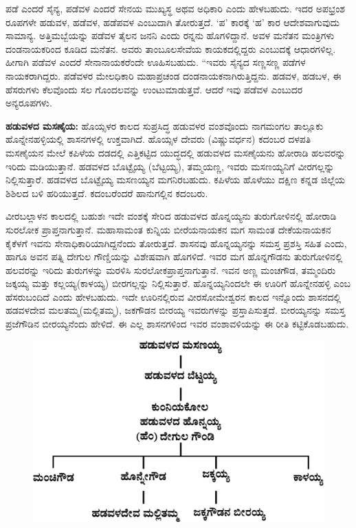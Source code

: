ಪಡೆ ಎಂದರೆ ಸೈನ್ಯ, ಪಡೆವಳ ಎಂದರೆ ಸೇನಯ ಮುಖ್ಯಸ್ಥ ಅಥವ ಅಧಿಕಾರಿ ಎಂದು ಹೇಳಬಹುದು. ಇದರ ಅಪಭ್ರಂಶ ರೂಪಗಳೇ ಹಡುವಳ, ಹಡೆವಳ, ಹಡೆಪವಳ ಎಂಬುದಾಗಿ ತೋರುತ್ತದೆ. ‘ಪ’ ಕಾರಕ್ಕೆ ‘ಹ’ ಕಾರ ಆದೇಶವಾಗುವುದು ಸಾಮಾನ್ಯ. ಅತ್ತಿಮಬ್ಬೆಯನ್ನು ಪಡೆವಳ ತೈಲನ ಜನನಿ ಎಂದು ರನ್ನನು ಹೊಗಳಿದ್ದಾನೆ. ಅವಳ ಮನೆತನ ಮಂತ್ರಿಗಳು ದಂಡನಾಯಕರಿಂದ ಕೂಡಿದ ಮನೆತನ. ಅವರು ತಾಂಬೂಲಸೇವೆಯ ಕಾಯಕದಲ್ಲಿದ್ದರು ಎಂಬುದಕ್ಕೆ ಆಧಾರಗಳಿಲ್ಲ. ಹೀಗಾಗಿ ಪಡೆವಳ ಎಂದರೆ ಸೇನಾನಾಯಕರೆಂದೇ ಊಹಿಸಬಹುದು. “ಇವರು ಸೈನ್ಯದ ಸಣ್ಣಸಣ್ಣ ಪಡೆಗಳ ನಾಯಕರಾಗಿದ್ದರು. ಪಡೆವಳರ ಮೇಲಧಿಕಾರಿ ಮಹಾಪ್ರಚಂಡ ದಂಡನಾಯಕನಾಗಿರುತ್ತಿದ್ದನು. ಹಡವಳ, ಹಡಬಳ, ಈ ಹೆಸರುಗಳು ಕೆಲವೊಂದು ಸಲ ಗೊಂದಲವನ್ನು ಉಂಟುಮಾಡುತ್ತವೆ. ಆದರೆ ಇವು ಪಡೆವಳ ಎಂಬುದರ ಅನ್ಯರೂಪಗಳು.

\newpage

\textbf{ಹಡುವಳದ ಮಸಣೈಯ:} ಹೊಯ್ಸಳರ ಕಾಲದ ಸುಪ್ರಸಿದ್ಧ ಹಡುವಳರ ವಂಶವೊಂದು ನಾಗಮಂಗಲ ತಾಲ್ಲೂಕು ಹೊನ್ನೇನಹಳ್ಳಿಯಲ್ಲಿ ಶಾಸನಗಳಲ್ಲಿ ಉಕ್ತವಾಗಿದೆ. ಹೊಯ್ಸಳ ದೇವರು (ವಿಷ್ಣುವರ್ಧನ) ಕದಂಬರ ದಳಪತಿ ಮಸಣೈಯನ ಮೇಲೆ ಕಪಿಳೆಯ ದಡದಲ್ಲಿ ಎತ್ತಿಕಟ್ಟಿದ ಯುದ್ಧದಲ್ಲಿ ಹಡುವಳದ ಮಸಣೈಯನು ಹೋರಾಡಿ ಹಲವರನ್ನು ಇರಿದು ಮಡಿಯುತ್ತಾನೆ. ಹಡವಳದ ಬೊಟ್ಟೈಯ್ಯ (ಬೆಟ್ಟಯ್ಯ), ತಮ್ಮಯಣ್ಣ, ಇವರು ಮಸಣಯ್ಯನಿಗೆ ವೀರಗಲ್ಲನ್ನು ನಿಲ್ಲಿಸುತ್ತಾರೆ. ಹಡವಳದ ಬೊಟ್ಟೈಯ್ಯ ಮಸಣಯ್ಯನ ಮಗನಿರಬಹುದು. ಕಪಿಳೆಯ ಹೊಳೆಯು ದಕ್ಷಿಣ ಕನ್ನಡ ಜಿಲ್ಲೆಯ ಶಿಶಿಲದ ಬಳಿ ಹರಿಯುತ್ತದೆ. ಕದಂಬರೆಂದರೆ ಹಾನುಗಲ್ಲಿನ ಕದಂಬರು.

ವೀರಬಲ್ಲಾಳನ ಕಾಲದಲ್ಲಿ ಬಹುಶಃ ಇದೇ ವಂಶಕ್ಕೆ ಸೇರಿದ ಹಡುವಳದ ಹೊನ್ನಯ್ಯನು ತುರುಗೋಳಿನಲ್ಲಿ ಹೋರಾಡಿ ಸುರಲೋಕ ಪ್ರಾಪ್ತನಾಗುತ್ತಾನೆ. ಮಹಾಸಾಮಂತ ಕುನ್ನಿಯ ಬೀರೆಯನಾಯಕನ ಮಗ ಸಾಮಂತ ದೇಕೆಯನಾಯಕನ ಕೈಕೆಳಗೆ ಇವನು ಸೇನಾಧಿಕಾರಿಯಾಗಿದ್ದನೆಂದು ತೋರುತ್ತದೆ. ಶಾಸನವು ಹೊನ್ನಯ್ಯನನ್ನು ಸಮಸ್ತ ಪ್ರಶಸ್ತಿ ಸಹಿತ ಎಂದು, ಹಾಗೂ ಅವನ ಪತ್ನಿ ದೇಗುಲ ಗೌಣ್ಡಿಯನ್ನು ವಿಶೇಷವಾಗಿ ಹೊಗಳಿದೆ. ಇವರ ಮಗ ಹೊನ್ನಗೌಡನು ತುರುಗೋಳಿನಲ್ಲಿ ಹಲವರನ್ನು ಇರಿದು ತುರುಗಳನ್ನು ಮರಳಿಸಿ ಸುರಲೋಕಪ್ರಾಪ್ತನಾಗುತ್ತಾನೆ. ಇವನ ಅಣ್ಣ ಮಂಚಗೌಡ, ತಮ್ಮಂದಿರು ಜಕ್ಕಯ್ಯ ಮತ್ತು ಕಲ್ಲಯ್ಯ(ಕಾಳಯ್ಯ) ಬೀರಗಲ್ಲನ್ನು ನಿಲ್ಲಿಸುತ್ತಾರೆ. ಹೊನ್ನಯ್ಯನಿಂದಲೇ ಈ ಊರಿಗೆ ಹೊನ್ನೇನಹಳ್ಳಿ ಎಂಬ ಹೆಸರುಬಂದಿದೆ ಎಂದು ಹೇಳಬಹುದು. ಇದೇ ಊರಿನಲ್ಲಿರುವ ವೀರಸೋಮೇಶ್ವರನ ಕಾಲದ ಇನ್ನೊಂದು ಶಾಸನದಲ್ಲಿ ಹಡವಳದೇವ ಮಲತಮ್ಮ(ಮಲ್ಲಿತಮ್ಮ), ಜಕಗೌಡನ ಬೀರಯ್ಯ ಇವರುಗಳನ್ನು ಪ್ರಸ್ತಾಪಿಸುತ್ತದೆ. ಬೀರಯ್ಯನನ್ನು ಸಮಸ್ತ ಪ್ರಜೆಗೌಡಿನ ಬೀರಯ್ಯನೆಂದು ಹೇಳಿದೆ. ಈ ಎಲ್ಲ ಶಾಸನಗಳಿಂದ ಇವರ ವಂಶಾವಳಿಯನ್ನು ಈ ರೀತಿ ಕಟ್ಟಿಕೊಡಬಹುದು.

\begin{figure}[H]
\includegraphics[scale=1.25]{images/chap3/chap3fig32.jpeg}
\end{figure}

